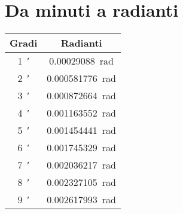 \section{Da minuti a radianti}
\begin{center}
	\begin{tabular}{cc}
		\toprule
		Gradi & Radianti \\
		\midrule
		\SI{1}{\arcminute}	&\SI[round-precision=\extralungarrotandamento,round-mode=places]{0.00029088}{\radian}  \\ 
		\SI{2}{\arcminute}&\SI[round-precision=\extralungarrotandamento,round-mode=places]{0.000581776}{\radian}  \\ 
		\SI{3}{\arcminute}&\SI[round-precision=\extralungarrotandamento,round-mode=places]{0.000872664}{\radian}  \\ 
		\SI{4}{\arcminute}&\SI[round-precision=\extralungarrotandamento,round-mode=places]{0.001163552}{\radian}  \\ 
		\SI{5}{\arcminute}&\SI[round-precision=\extralungarrotandamento,round-mode=places]{0.001454441}{\radian}  \\ 
		\SI{6}{\arcminute}&\SI[round-precision=\extralungarrotandamento,round-mode=places]{0.001745329}{\radian}  \\ 
		\SI{7}{\arcminute}&\SI[round-precision=\extralungarrotandamento,round-mode=places]{0.002036217}{\radian}  \\ 
		\SI{8}{\arcminute}&\SI[round-precision=\extralungarrotandamento,round-mode=places]{0.002327105}{\radian}  \\ 
		\SI{9}{\arcminute}&\SI[round-precision=\extralungarrotandamento,round-mode=places]{0.002617993}{\radian}  \\  
		\bottomrule
	\end{tabular} 
\end{center}
